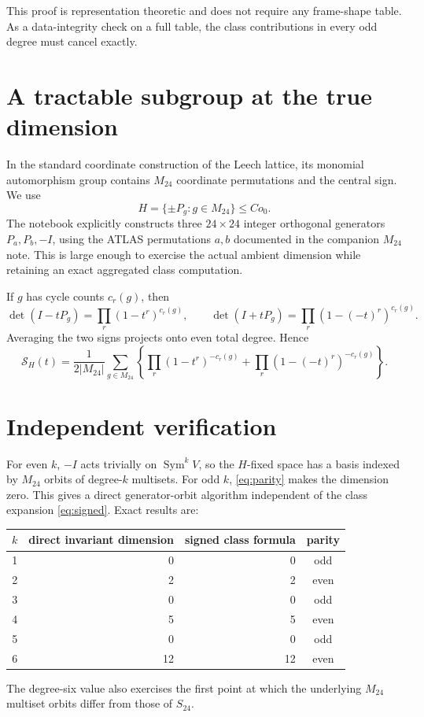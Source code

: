 \documentclass[11pt]{article}
\newcommand{\Sgm}{\mathcal S}
\begin{document}
This proof is representation theoretic and does not require any frame-shape
table.  As a data-integrity check on a full table, the class contributions in
every odd degree must cancel exactly.

\section{A tractable subgroup at the true dimension}
In the standard coordinate construction of the Leech lattice, its monomial
automorphism group contains $M_{24}$ coordinate permutations and the central
sign.  We use
\[
H=\{\pm P_g:g\in M_{24}\}\leq Co_0.
\]
The notebook explicitly constructs three $24\times24$ integer orthogonal
generators $P_a,P_b,-I$, using the ATLAS permutations $a,b$ documented in the
companion $M_{24}$ note.  This is large enough to exercise the actual ambient
dimension while retaining an exact aggregated class computation.

If $g$ has cycle counts $c_r(g)$, then
\[
\det(I-tP_g)=\prod_r(1-t^r)^{c_r(g)},\qquad
\det(I+tP_g)=\prod_r(1-(-t)^r)^{c_r(g)}.
\]
Averaging the two signs projects onto even total degree.  Hence
\begin{equation}\label{eq:signed}
\Sgm_H(t)=\frac1{2|M_{24}|}\sum_{g\in M_{24}}
\left\{\prod_r(1-t^r)^{-c_r(g)}+
\prod_r(1-(-t)^r)^{-c_r(g)}\right\}.
\end{equation}

\section{Independent verification}
For even $k$, $-I$ acts trivially on $\operatorname{Sym}^kV$, so the $H$-fixed
space has a basis indexed by $M_{24}$ orbits of degree-$k$ multisets.  For odd
$k$, \eqref{eq:parity} makes the dimension zero.  This gives a direct
generator-orbit algorithm independent of the class expansion
\eqref{eq:signed}.  Exact results are:
\begin{center}
\begin{tabular}{@{}crrc@{}}\toprule
$k$ & direct invariant dimension & signed class formula & parity\\\midrule
1&0&0&odd\\
2&2&2&even\\
3&0&0&odd\\
4&5&5&even\\
5&0&0&odd\\
6&12&12&even\\\bottomrule
\end{tabular}
\end{center}
The degree-six value also exercises the first point at which the underlying
$M_{24}$ multiset orbits differ from those of $S_{24}$.
\end{document}
